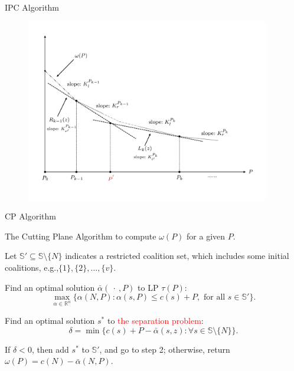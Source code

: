 \documentclass[14pt]{beamer}
\begin{document}
\begin{frame}{IPC Algorithm}
	\vspace{-3mm}
	\begin{figure}[H]
	\centering
	\includegraphics[width=0.95\textwidth]{Figures/IPC}
	\end{figure}
	\centering
\end{frame}


\begin{frame}{CP Algorithm}
	\begin{block}
		{The Cutting Plane Algorithm to compute $\omega(P)$ for a given $P$.}
	\end{block}
	\begin{description}
	  \justifying
		\footnotesize
	  \item[Step 1.] Let $\mathbb{S}'\subseteq \mathbb{S}\setminus \{N\}$ indicates a restricted coalition set, which includes some initial coalitions,
	  \vspace{10pt}
	  e.g.,$ \{1\},\{2\},\ldots,\{v\}$.
	  \item[Step 2.] Find an optimal solution $\bar{\alpha}(\ \cdot \ ,P)$ to LP $\tau(P)$:
	  \begin{equation*}
	  \max_{\alpha\in \mathbb{R}^n} \big\{ \alpha(N,P): \alpha(s,P) \leq c(s)+P, \mbox{ for all } s \in \mathbb{S}'\big\}.
	  \end{equation*}
	  \vspace{-11pt}
	  \item[Step 3.]
	  Find an optimal solution $s^*$ to \textcolor{red}{the separation problem}:
	  \begin{equation*}
	  \delta = \min \big\{ c(s)+ P -\bar{\alpha}(s,z): \forall s \in \mathbb{S} \setminus \{N\}\big\}.
	  \end{equation*}
	  \item[Step 4.]
	  If $\delta<0$, then add $s^*$ to $\mathbb{S}'$, and go to step 2; otherwise, return $\omega(P)=c(N)-\bar{\alpha}(N,P)$.
	\end{description}
\end{frame}
\end{document}
